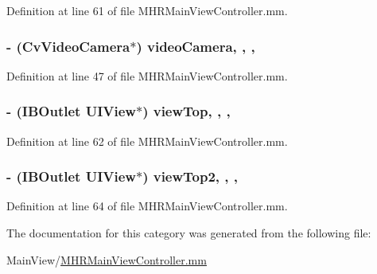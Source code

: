 Definition at line 61 of file M\+H\+R\+Main\+View\+Controller.\+mm.

\hypertarget{category_m_h_r_main_view_controller_07_08_a82652cbbdc0ac312a50c591870b579c1}{
\subsubsection[{video\+Camera}]{\setlength{\rightskip}{0pt plus 5cm}-\/ (Cv\+Video\+Camera$\ast$) video\+Camera\hspace{0.3cm}{\ttfamily [read]}, {\ttfamily [write]}, {\ttfamily [nonatomic]}, {\ttfamily [retain]}}}\label{category_m_h_r_main_view_controller_07_08_a82652cbbdc0ac312a50c591870b579c1}


Definition at line 47 of file M\+H\+R\+Main\+View\+Controller.\+mm.

\hypertarget{category_m_h_r_main_view_controller_07_08_a012367c6522cfb5d64c9d5dadcb272e2}{
\subsubsection[{view\+Top}]{\setlength{\rightskip}{0pt plus 5cm}-\/ (I\+B\+Outlet U\+I\+View$\ast$) view\+Top\hspace{0.3cm}{\ttfamily [read]}, {\ttfamily [write]}, {\ttfamily [nonatomic]}, {\ttfamily [weak]}}}\label{category_m_h_r_main_view_controller_07_08_a012367c6522cfb5d64c9d5dadcb272e2}


Definition at line 62 of file M\+H\+R\+Main\+View\+Controller.\+mm.

\hypertarget{category_m_h_r_main_view_controller_07_08_ae61668adf80d339aabb1c9dcb3085428}{
\subsubsection[{view\+Top2}]{\setlength{\rightskip}{0pt plus 5cm}-\/ (I\+B\+Outlet U\+I\+View$\ast$) view\+Top2\hspace{0.3cm}{\ttfamily [read]}, {\ttfamily [write]}, {\ttfamily [nonatomic]}, {\ttfamily [weak]}}}\label{category_m_h_r_main_view_controller_07_08_ae61668adf80d339aabb1c9dcb3085428}


Definition at line 64 of file M\+H\+R\+Main\+View\+Controller.\+mm.



The documentation for this category was generated from the following file\+:\begin{DoxyCompactItemize}
\item 
Main\+View/\hyperlink{_m_h_r_main_view_controller_8mm}{M\+H\+R\+Main\+View\+Controller.\+mm}\end{DoxyCompactItemize}
